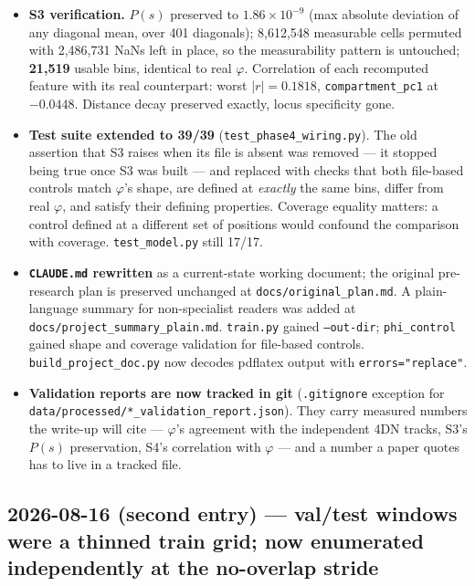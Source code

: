 \documentclass[11pt,a4paper]{article}
\newcommand{\code}[1]{\texttt{\small #1}}
\begin{document}
\begin{itemize}
\item \textbf{S3 verification.} $P(s)$ preserved to $1.86\times10^{-9}$ (max
absolute deviation of any diagonal mean, over 401 diagonals); 8{,}612{,}548
measurable cells permuted with 2{,}486{,}731 NaNs left in place, so the
measurability pattern is untouched; \textbf{21{,}519} usable bins, identical to
real $\varphi$. Correlation of each recomputed feature with its real counterpart:
worst $|r| = 0.1818$, \code{compartment\_pc1} at $-0.0448$. Distance decay
preserved exactly, locus specificity gone.

\item \textbf{Test suite extended to 39/39} (\code{test\_phase4\_wiring.py}). The
old assertion that S3 raises when its file is absent was removed --- it stopped
being true once S3 was built --- and replaced with checks that both file-based
controls match $\varphi$'s shape, are defined at \emph{exactly} the same bins,
differ from real $\varphi$, and satisfy their defining properties. Coverage
equality matters: a control defined at a different set of positions would confound
the comparison with coverage. \code{test\_model.py} still 17/17.

\item \textbf{\code{CLAUDE.md} rewritten} as a current-state working document; the
original pre-research plan is preserved unchanged at \code{docs/original\_plan.md}.
A plain-language summary for non-specialist readers was added at
\code{docs/project\_summary\_plain.md}. \code{train.py} gained \code{--out-dir};
\code{phi\_control} gained shape and coverage validation for file-based controls.
\code{build\_project\_doc.py} now decodes pdflatex output with
\code{errors="replace"}.

\item \textbf{Validation reports are now tracked in git} (\code{.gitignore}
exception for \code{data/processed/*\_validation\_report.json}). They carry
measured numbers the write-up will cite --- $\varphi$'s agreement with the
independent 4DN tracks, S3's $P(s)$ preservation, S4's correlation with $\varphi$
--- and a number a paper quotes has to live in a tracked file.
\end{itemize}

\subsection*{2026-08-16 (second entry) --- val/test windows were a thinned
train grid; now enumerated independently at the no-overlap stride}
\end{document}
